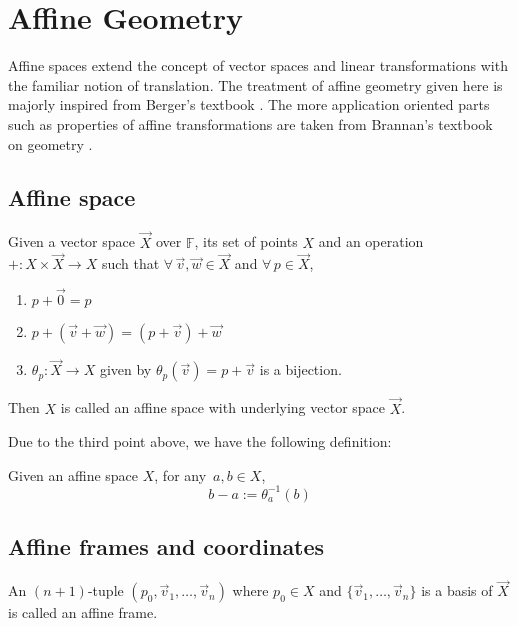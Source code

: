 \chapter{Affine Geometry} \label{ch:affine}

Affine spaces extend the concept of vector spaces and linear transformations with
the familiar notion of translation. The treatment of affine geometry given here
is majorly inspired from Berger's textbook \cite{berger}. The more application
oriented parts such as properties of affine transformations are taken from
Brannan's textbook on geometry \cite{brannan}.

\section{Affine space}

\begin{definition}
    Given a vector space $\vec{X}$ over $\mathbb{F}$, its set of points $X$ and
    an operation $+\colon X\times\vec{X} \to X$ such that $\forall\,\vec{v},\vec{w}\in\vec{X}$
    and $\forall\,p\in\vec{X}$,
    \begin{enumerate}
        \item $p + \vec{0} = p$
        \item $p + (\vec{v} + \vec{w}) = (p + \vec{v}) + \vec{w}$
        \item $\theta_{p} \colon \vec{X} \to X$ given by
            $\theta_{p}(\vec{v}) = p + \vec{v}$ is a bijection.
    \end{enumerate}
    Then $X$ is called an affine space with underlying vector space $\vec{X}$.
\end{definition}

\noindent
Due to the third point above, we have the following definition:

\begin{definition}
    Given an affine space $X$, for any $\,a,b \in X$,
    \[ b - a := \theta_a^{-1}(b) \]
\end{definition}

\section{Affine frames and coordinates}

\begin{definition}
    An $(n+1)$-tuple $(p_0,\vec{v}_1,\dots,\vec{v}_n)$ where $p_0 \in X$ and
    $\{\vec{v}_1,\dots,\vec{v}_n\}$ is a basis of $\vec{X}$ is called an affine
    frame.
\end{definition}

